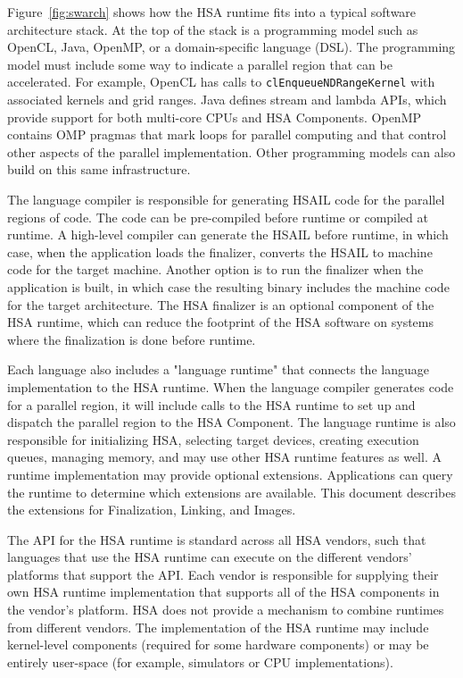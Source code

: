 \documentclass[final,oneside]{book}
\begin{document}
Figure~\ref{fig:swarch} shows how the HSA runtime fits into a typical software
architecture stack. At the top of the stack is a programming model such as
OpenCL\texttrademark, Java, OpenMP, or a domain-specific language (DSL). The
programming model must include some way to indicate a parallel region that can
be accelerated. For example, OpenCL has calls to \texttt{clEnqueueNDRangeKernel}
with associated kernels and grid ranges. Java defines stream and lambda APIs,
which provide support for both multi-core CPUs and HSA Components. OpenMP
contains OMP pragmas that mark loops for parallel computing and that control
other aspects of the parallel implementation. Other programming models can also
build on this same infrastructure.

The language compiler is responsible for generating HSAIL code for the parallel
regions of code. The code can be pre-compiled before runtime or compiled at
runtime. A high-level compiler can generate the HSAIL before runtime, in which
case, when the application loads the finalizer, converts the HSAIL to machine
code for the target machine. Another option is to run the finalizer when the
application is built, in which case the resulting binary includes the machine
code for the target architecture. The HSA finalizer is an optional component of
the HSA runtime, which can reduce the footprint of the HSA software on systems
where the finalization is done before runtime.

Each language also includes a "language runtime" that connects the language
implementation to the HSA runtime. When the language compiler generates code for
a parallel region, it will include calls to the HSA runtime to set up and
dispatch the parallel region to the HSA Component. The language runtime is also
responsible for initializing HSA, selecting target devices, creating execution
queues, managing memory, and may use other HSA runtime features as well.
A runtime implementation may provide optional extensions. Applications can
query the runtime to determine which extensions are available. This document
describes the extensions for Finalization, Linking, and Images.

The API for the HSA runtime is standard across all HSA vendors, such that
languages that use the HSA runtime can execute on the different vendors'
platforms that support the API. Each vendor is responsible for supplying their
own HSA runtime implementation that supports all of the HSA components in the
vendor's platform. HSA does not provide a mechanism to combine runtimes from
different vendors. The implementation of the HSA runtime may include
kernel-level components (required for some hardware components) or may be entirely
user-space (for example, simulators or CPU implementations).
\end{document}
